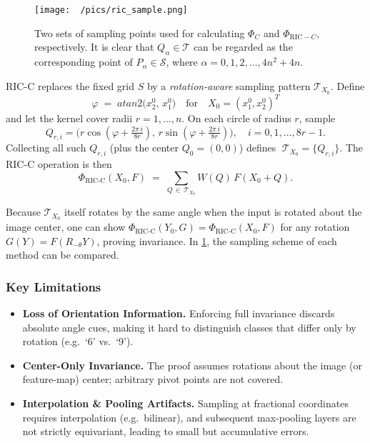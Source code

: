\begin{figure}
    \centering
    \texttt{[image: ~/pics/ric\_sample.png]}
    \caption{Two sets of sampling points used for calculating $\Phi_C$ and $\Phi_{\mathrm{RIC}-C}$, respectively. It is clear that $Q_\alpha\in\mathcal T$ can be regarded as the corresponding point of $P_\alpha\in\mathcal S$, where $\alpha=0,1,2,\dots,4n^2+4n$.}
    \label{fig:ric_sample}
\end{figure}
RIC-C replaces the fixed grid \(S\) by a \emph{rotation-aware} sampling pattern \(\mathcal T_{X_0}\).  Define
\[
\varphi \;=\;atan2\bigl(x^0_2,\,x^0_1\bigr)
\quad\text{for}\quad
X_0=(x^0_1,x^0_2)^T
\]
and let the kernel cover radii \(r=1,\dots,n\).  On each circle of radius \(r\), sample
\begin{equation}
Q_{r,i}
=
\bigl(r\cos(\varphi + \tfrac{2\pi\,i}{8r}),\,r\sin(\varphi + \tfrac{2\pi\,i}{8r})\bigr),
\quad
i=0,1,\dots,8r-1.
\label{eq:ric_points}
\end{equation}
Collecting all such \(Q_{r,i}\) (plus the center \(Q_{0}=(0,0)\)) defines
\(\;\mathcal T_{X_0}=\{Q_{r,i}\}\).
The RIC-C operation is then
\begin{equation}
\Phi_{\mathrm{RIC\text{-}C}}(X_0, F)
\;=\;
\sum_{Q \,\in\, \mathcal T_{X_0}} W(Q)\,F(X_0 + Q).
\label{eq:ric_conv}
\end{equation}

\noindent
Because \(\mathcal T_{X_0}\) itself rotates by the same angle when the input is rotated about the image center, one can show
\(\Phi_{\mathrm{RIC\text{-}C}}(Y_0,G) = \Phi_{\mathrm{RIC\text{-}C}}(X_0,F)\)
for any rotation \(G(Y) = F(R_{-\theta} Y)\), proving invariance. In \ref{fig:ric_sample}, the sampling scheme of each method can be compared.

\subsubsection*{Key Limitations}

\begin{itemize}
  \item \textbf{Loss of Orientation Information.}  Enforcing full invariance discards absolute angle cues, making it hard to distinguish classes that differ only by rotation (e.g.\ ‘6’ vs.\ ‘9’).  
  \item \textbf{Center-Only Invariance.}  The proof assumes rotations about the image (or feature-map) center; arbitrary pivot points are not covered.  
  \item \textbf{Interpolation \& Pooling Artifacts.}  Sampling at fractional coordinates requires interpolation (e.g.\ bilinear), and subsequent max-pooling layers are not strictly equivariant, leading to small but accumulative errors.
\end{itemize}